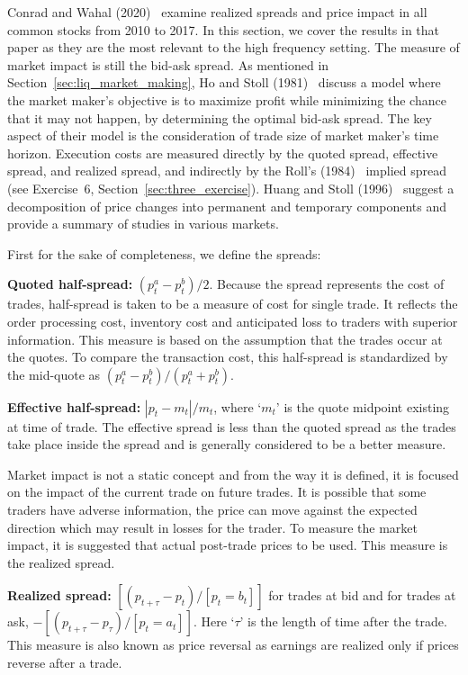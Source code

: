 Conrad and Wahal (2020)~\cite{wahal2020} examine realized spreads and price impact in all common stocks from 2010 to 2017. In this section, we cover the results in that paper as they are the most relevant to the high frequency setting. The measure of market impact is still the bid-ask spread. As mentioned in Section~\ref{sec:liq_market_making}, Ho and Stoll (1981)~\cite{ho1981} discuss a model where the market maker's objective is to maximize profit while minimizing the chance that it may not happen, by determining the optimal bid-ask spread. The key aspect of their model is the consideration of trade size of market maker's time horizon. Execution costs are measured directly by the quoted spread, effective spread, and realized spread, and indirectly by the Roll's (1984)~\cite{roll1984} implied spread (see Exercise~6, Section~\ref{sec:three_exercise}). Huang and Stoll (1996)~\cite{huang_stoll1996} suggest a decomposition of price changes into permanent and temporary components and provide a summary of studies in various markets. 


First for the sake of completeness, we define the spreads: \twomedskip


\noindent\textbf{Quoted half-spread:} $(p_t^a - p_t^b)/2$. Because the spread represents the cost of trades, half-spread is taken to be a measure of cost for single trade. It reflects the order processing cost, inventory cost and anticipated loss to traders with superior information. This measure is based on the assumption that the trades occur at the quotes. To compare the transaction cost, this half-spread is standardized by the mid-quote as $(p_t^a - p_t^b)/ (p_t^a + p_t^b)$.  \twomedskip


\noindent\textbf{Effective half-spread:} $|p_t - m_t|/m_t$, where `$m_t$' is the quote midpoint existing at time of trade. The effective spread is less than the quoted spread as the trades take place inside the spread and is generally considered to be a better measure. 


Market impact is not a static concept and from the way it is defined, it is focused on the impact of the current trade on future trades. It is possible that some traders have adverse information, the price can move against the expected direction which may result in losses for the trader. To measure the market impact, it is suggested that actual post-trade prices to be used. This measure is the realized spread. \twomedskip


\noindent\textbf{Realized spread:} $[(p_{t+ \tau} - p_t)/[p_t= b_t]]$ for trades at bid and for trades at ask, $-[(p_{t+ \tau} - p_\tau)/[p_t= a_t]]$. Here `$\tau$' is the length of time after the trade. This measure is also known as price reversal as earnings are realized only if prices reverse after a trade. \twomedskip


